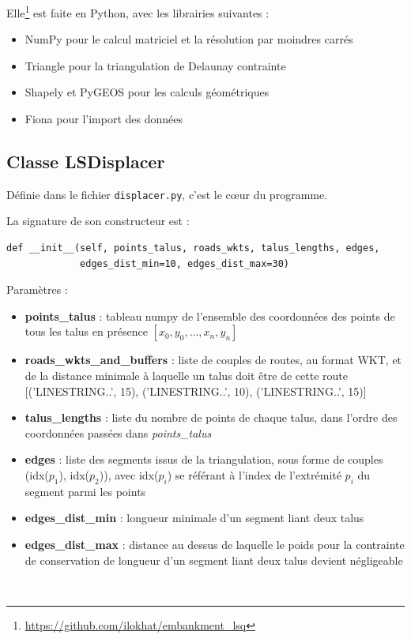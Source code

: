\documentclass[11pt]{article}
\begin{document}
Elle\footnote{\url{https://github.com/ilokhat/embankment_lsq}} est faite en Python, avec les librairies suivantes :
\begin{itemize}
	\item NumPy pour le calcul matriciel et la résolution par moindres carrés
	\item Triangle pour la triangulation de Delaunay contrainte
	\item Shapely et PyGEOS pour les calculs géométriques
	\item Fiona pour l'import des données
\end{itemize}

\subsection{Classe LSDisplacer }
Définie dans le fichier \verb|displacer.py|, c'est le cœur du programme.

La signature de son constructeur est :

\begin{verbatim}
def __init__(self, points_talus, roads_wkts, talus_lengths, edges, 
             edges_dist_min=10, edges_dist_max=30)
\end{verbatim}

Paramètres :
\begin{itemize}
	\item \textbf{points\_talus} : tableau numpy de l'ensemble des coordonnées des points de tous les talus en présence $[x_0, y_0, \ldots , x_n, y_n]$
	\item \textbf{roads\_wkts\_and\_buffers} : liste de couples de routes, au format WKT, et de la distance minimale à laquelle un talus doit être de cette route [('LINESTRING..', 15), ('LINESTRING..', 10), ('LINESTRING..', 15)]
	\item \textbf{talus\_lengths} : liste du nombre de points de chaque talus, dans l'ordre des coordonnées passées dans \textit{points\_talus}
	\item \textbf{edges} : liste des segments issus de la triangulation, sous forme de couples (idx($p_1$), idx($p_2$)), avec idx($p_i$) se référant à l'index de l'extrémité $p_i$ du segment parmi les points
	\item \textbf{edges\_dist\_min} : longueur minimale d'un segment liant deux talus
	\item \textbf{edges\_dist\_max} : distance au dessus de laquelle le poids pour la contrainte de conservation de longueur d'un segment liant deux talus devient négligeable
	
\end{itemize}
\
\end{document}
